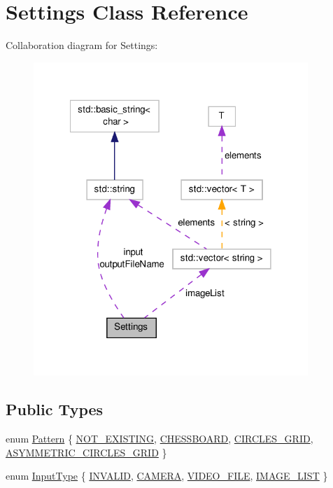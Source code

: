 \hypertarget{classSettings}{\section{Settings Class Reference}
\label{classSettings}
}


Collaboration diagram for Settings\-:
\nopagebreak
\begin{figure}[H]
\begin{center}
\leavevmode
\includegraphics[width=294pt]{classSettings__coll__graph}
\end{center}
\end{figure}
\subsection*{Public Types}
\begin{DoxyCompactItemize}
\item 
enum \hyperlink{classSettings_a0e7117abd9427a6f8bc1d1d8d456b5c8}{Pattern} \{ \hyperlink{classSettings_a0e7117abd9427a6f8bc1d1d8d456b5c8ad2f421ce100bd7e0302b17bda1a74eb9}{N\-O\-T\-\_\-\-E\-X\-I\-S\-T\-I\-N\-G}, 
\hyperlink{classSettings_a0e7117abd9427a6f8bc1d1d8d456b5c8ae96aa2d60b4a554a215524a05b32908e}{C\-H\-E\-S\-S\-B\-O\-A\-R\-D}, 
\hyperlink{classSettings_a0e7117abd9427a6f8bc1d1d8d456b5c8a79472d1c69f8ed7aa1b55f908b136f68}{C\-I\-R\-C\-L\-E\-S\-\_\-\-G\-R\-I\-D}, 
\hyperlink{classSettings_a0e7117abd9427a6f8bc1d1d8d456b5c8a2cea29ee5896f2cb4cc64df25fd2375b}{A\-S\-Y\-M\-M\-E\-T\-R\-I\-C\-\_\-\-C\-I\-R\-C\-L\-E\-S\-\_\-\-G\-R\-I\-D}
 \}
\item 
enum \hyperlink{classSettings_a5afe85d24b071973a7f248c05386f7f4}{Input\-Type} \{ \hyperlink{classSettings_a5afe85d24b071973a7f248c05386f7f4adb44130895aedc32a119565eb6d61bed}{I\-N\-V\-A\-L\-I\-D}, 
\hyperlink{classSettings_a5afe85d24b071973a7f248c05386f7f4aba4cc7726878c8913831f0ea6360fa05}{C\-A\-M\-E\-R\-A}, 
\hyperlink{classSettings_a5afe85d24b071973a7f248c05386f7f4ac9fd97535bc651249f9eed1fddf2d36b}{V\-I\-D\-E\-O\-\_\-\-F\-I\-L\-E}, 
\hyperlink{classSettings_a5afe85d24b071973a7f248c05386f7f4a292bd2e5ba912a92ace1606e366edc4d}{I\-M\-A\-G\-E\-\_\-\-L\-I\-S\-T}
 \}
\end{DoxyCompactItemize}
